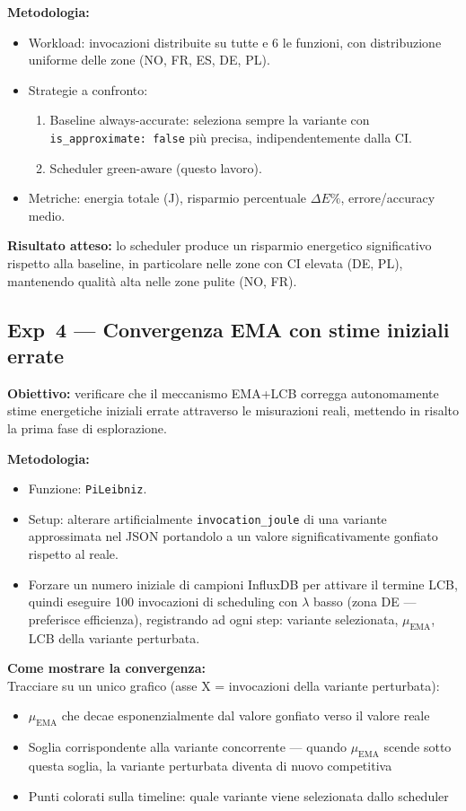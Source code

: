 \documentclass[a4paper,11pt]{article}
\begin{document}
\medskip
\textbf{Metodologia:}
\begin{itemize}
  \item Workload: invocazioni distribuite su tutte e 6 le funzioni, con distribuzione
    uniforme delle zone (NO, FR, ES, DE, PL).
  \item Strategie a confronto:
    \begin{enumerate}
      \item Baseline always-accurate: seleziona sempre la variante con
        \texttt{is\_approximate: false} più precisa, indipendentemente dalla CI.
      \item Scheduler green-aware (questo lavoro).
    \end{enumerate}
  \item Metriche: energia totale (J), risparmio percentuale $\Delta E\%$,
    errore/accuracy medio.
\end{itemize}

\textbf{Risultato atteso:} lo scheduler produce un risparmio energetico significativo
rispetto alla baseline, in particolare nelle zone con CI elevata (DE, PL), mantenendo
qualità alta nelle zone pulite (NO, FR).

\subsection{Exp~4 --- Convergenza EMA con stime iniziali errate}

\textbf{Obiettivo:} verificare che il meccanismo EMA+LCB corregga autonomamente stime
energetiche iniziali errate attraverso le misurazioni reali, mettendo in risalto la
prima fase di esplorazione.

\medskip
\textbf{Metodologia:}
\begin{itemize}
  \item Funzione: \texttt{PiLeibniz}.
  \item Setup: alterare artificialmente \texttt{invocation\_joule} di una variante
    approssimata nel JSON portandolo a un valore significativamente gonfiato rispetto
    al reale.
  \item Forzare un numero iniziale di campioni InfluxDB per attivare il termine LCB,
    quindi eseguire 100 invocazioni di scheduling con $\lambda$ basso (zona DE ---
    preferisce efficienza), registrando ad ogni step: variante selezionata,
    $\mu_{\text{EMA}}$, LCB della variante perturbata.
\end{itemize}

\medskip
\noindent\textbf{Come mostrare la convergenza:}\\
Tracciare su un unico grafico (asse X = invocazioni della variante perturbata):
\begin{itemize}
  \item $\mu_{\text{EMA}}$ che decae esponenzialmente dal valore gonfiato verso il
    valore reale
  \item Soglia corrispondente alla variante concorrente --- quando $\mu_{\text{EMA}}$
    scende sotto questa soglia, la variante perturbata diventa di nuovo competitiva
  \item Punti colorati sulla timeline: quale variante viene selezionata dallo scheduler
\end{itemize}
\end{document}
